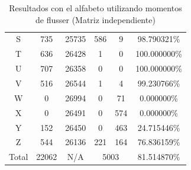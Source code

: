 \documentclass[a4paper, 11pt, oneside]{report}
\begin{document}
\begin{table}
\begin{tabular}{|c|c|c|c|c|c|}
	S & 735 & 25735 & 586 & 9 & 98.790321\% \\ 
	T & 636 & 26428 & 1 & 0 & 100.000000\% \\ 
	U & 707 & 26358 & 0 & 0 & 100.000000\% \\ 
	V & 516 & 26544 & 1 & 4 & 99.230766\% \\ 
	W & 0 & 26994 & 0 & 71 & 0.000000\% \\ 
	X & 0 & 26491 & 0 & 574 & 0.000000\% \\ 
	Y & 152 & 26450 & 0 & 463 & 24.715446\% \\ 
	Z & 544 & 26136 & 221 & 164 & 76.836159\% \\ 
	\hline
	Total & 22062 & N/A & \multicolumn{2}{|c|}{5003} & 81.514870\% \\
	\hline
\end{tabular}
\caption{Resultados con el alfabeto utilizando momentos de flusser (Matriz independiente)}
\label{tb:alphaFlIndep}
\end{table}
\end{document}
